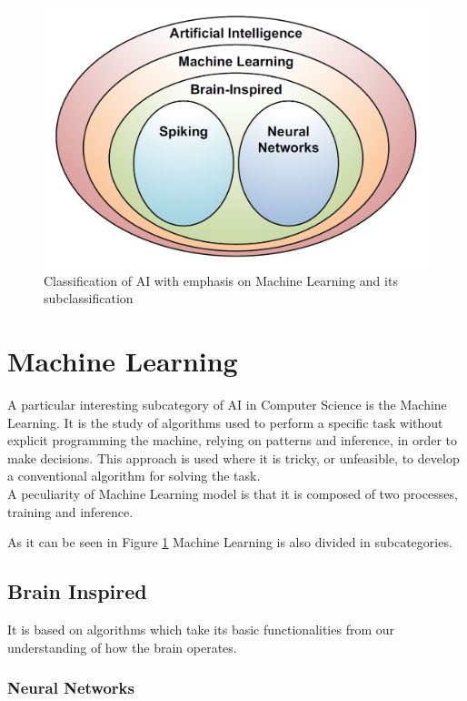 \begin{figure}
\centering
\captionsetup{justification=centering}
\includegraphics[scale=0.5]{./figure/ai_division.PNG}
\caption{Classification of AI with emphasis on Machine Learning and its subclassification}
\label{fig:aidiv}
\end{figure}

\section{Machine Learning}
A particular interesting subcategory of AI in Computer Science is the Machine Learning. It is the study of algorithms used to perform a specific task without explicit programming the machine, relying on patterns and inference, in order to make decisions. This approach is used where it is tricky, or unfeasible, to develop a conventional algorithm for solving the task.\\

A peculiarity of Machine Learning model is that it is composed of two processes, training and inference.

As it can be seen in Figure \ref{fig:aidiv} Machine Learning is also divided in subcategories.
\subsection{Brain Inspired}
It is based on algorithms which take its basic functionalities from our understanding of how the brain operates.

\subsubsection{Neural Networks}

